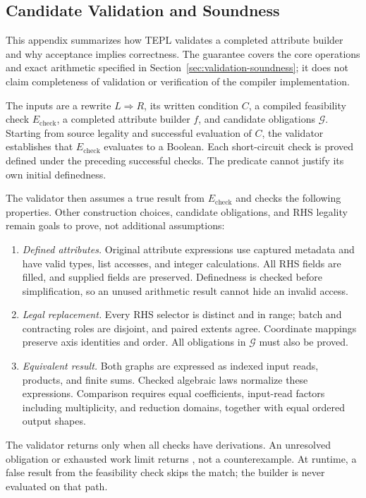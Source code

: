 \subsection{Candidate Validation and Soundness}
\label{app:candidate-validation-and-soundness}
This appendix summarizes how TEPL validates a completed attribute builder
and why acceptance implies correctness. The guarantee covers the core
operations and exact arithmetic specified in
Section~\ref{sec:validation-soundness}; it does not claim
completeness of validation or verification of the compiler implementation.

\label{app:validation-procedure}
The inputs are a rewrite $L\Rightarrow R$, its written condition $C$, a
compiled feasibility check $E_{\mathrm{check}}$, a completed attribute builder
$f$, and candidate obligations $\mathcal G$. Starting from source legality
and successful evaluation of $C$, the validator establishes that $E_{\mathrm{check}}$
evaluates to a Boolean. Each short-circuit check is proved defined under
the preceding successful checks. The predicate cannot justify its own
initial definedness.

The validator then assumes a true result from $E_{\mathrm{check}}$ and checks the
following properties. Other construction choices, candidate obligations,
and RHS legality remain goals to prove, not additional assumptions:
\begin{enumerate}
\item \emph{Defined attributes.} Original attribute expressions use captured
metadata and have valid types, list accesses, and integer calculations.
All RHS fields are filled, and supplied fields are preserved. Definedness
is checked before simplification, so an unused arithmetic result cannot
hide an invalid access.
\item \emph{Legal replacement.} Every RHS selector is distinct and in range;
batch and contracting roles are disjoint, and paired extents agree.
Coordinate mappings preserve axis identities and order. All obligations
in $\mathcal G$ must also be proved.
\item \emph{Equivalent result.} Both graphs are expressed as indexed input
reads, products, and finite sums. Checked algebraic laws normalize these
expressions. Comparison requires equal coefficients, input-read factors
including multiplicity, and reduction domains, together with equal
ordered output shapes.
\end{enumerate}
The validator returns  only when all checks have derivations.
An unresolved obligation or exhausted work limit returns ,
not a counterexample. At runtime, a false result from the feasibility
check skips the match; the builder is never evaluated on that path.

